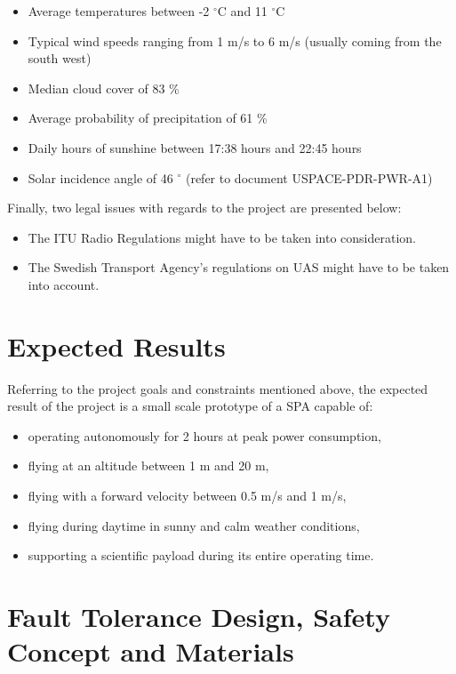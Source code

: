 \begin{itemize}
\item Average temperatures between -2 $^\circ$C and 11 $^\circ$C 
\item Typical wind speeds ranging from 1 m/s to 6 m/s (usually coming from the south west)
\item Median cloud cover of 83 \%
\item Average probability of precipitation of 61 \%
\item Daily hours of sunshine between 17:38 hours and 22:45 hours
\item Solar incidence angle of 46 $^\circ$ (refer to document USPACE-PDR-PWR-A1)
\end{itemize}

\noindent
Finally, two legal issues with regards to the project are presented below:

\begin{itemize}
\item The \ac{ITU} Radio Regulations \cite{book:freqalloc} might have to be taken into consideration.
\item The Swedish Transport Agency's regulations on \ac{UAS} \cite{regulations:uas2009} might have to be taken into account.
\end{itemize}

\section{Expected Results}

Referring to the project goals and constraints mentioned above, the expected result of the project is a small scale prototype of a \ac{SPA} capable of:

\begin{itemize}
\item operating autonomously for 2 hours at peak power consumption,
\item flying at an altitude between 1 m and 20 m,
\item flying with a forward velocity between 0.5 m/s and 1 m/s,
\item flying during daytime in sunny and calm weather conditions,
\item supporting a scientific payload during its entire operating time.
\end{itemize}

\section{Fault Tolerance Design, Safety Concept and Materials}

